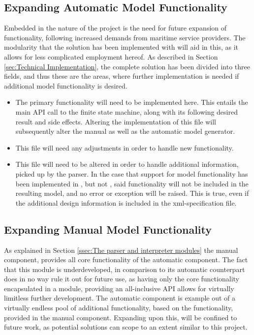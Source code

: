 \subsection{Expanding Automatic Model Functionality}
Embedded in the nature of the project is the need for future expansion of functionality, following increased demands from maritime service providers. The modularity that the solution has been implemented with will aid in this, as it allows for less complicated employment hereof. As described in Section \ref{sec:Technical Implementation}, the complete solution has been divided into three fields, and thus these are the areas, where further implementation is needed if additional model functionality is desired.
\begin{itemize}
  \item {}
    The primary functionality will need to be implemented here. This entails the main API call to the finite state machine, along with its following desired result and side effects. Altering the implementation of this file will subsequently alter the manual as well as the automatic model generator.
  \item {}
    This file will  need any adjustments in order to handle new functionality.
  \item {}
    This file will need to be altered in order to handle additional information, picked up by the parser. In the case that support for model functionality has been implemented in , but not , said functionality will not be included in the resulting model, and no error or exception will be raised. This is true, even if the additional design information is included in the xml-specification file.
\end{itemize}

\subsection{Expanding Manual Model Functionality}
As explained in Section \ref{ssec:The parser and interpreter modules} the manual component, provides all core functionality of the automatic component. The fact that this module is underdeveloped, in comparison to its automatic counterpart does in no way rule it out for future use, as having only the core functionality encapsulated in a module, providing an all-inclusive API allows for virtually limitless further development. The automatic component is  example out of a virtually endless pool of additional functionality, based on the functionality, provided in the manual component. Expanding upon this, will be confined to future work, as potential solutions can scope to an extent similar to this project.

